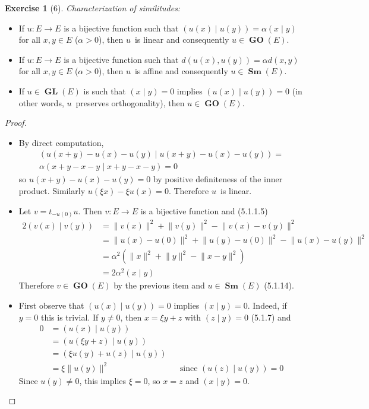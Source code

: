 \documentclass[letterpaper,12pt]{article}
\DeclareMathOperator{\GL}{\mathbf{GL}}
\DeclareMathOperator{\GO}{\mathbf{GO}}
\DeclareMathOperator{\Sm}{\mathbf{Sm}}
\newcommand{\norm}[1]{\lVert{#1}\rVert}
\newcommand{\innerprod}[2]{({#1}\;|\;{#2})}
\theoremstyle{definition}
\newtheorem*{exer}{Exercise}
\theoremstyle{remark}
\begin{document}
\begin{exer}[6]
\emph{Characterization of similitudes:}
\begin{itemize}[itemsep=0pt]
\item If \(u:E\to E\) is a bijective function such that \(\innerprod{u(x)}{u(y)}=\alpha\innerprod{x}{y}\) for all \(x,y\in E\) (\(\alpha>0\)), then \(u\)~is linear and consequently \(u\in\GO(E)\).
\item If \(u:E\to E\) is a bijective function such that \(d(u(x),u(y))=\alpha d(x,y)\) for all \(x,y\in E\) (\(\alpha>0\)), then \(u\)~is affine and consequently \(u\in\Sm(E)\).
\item If \(u\in\GL(E)\) is such that \(\innerprod{x}{y}=0\) implies \(\innerprod{u(x)}{u(y)}=0\) (in other words, \(u\)~preserves orthogonality), then \(u\in\GO(E)\).
\end{itemize}
\begin{proof}\
\begin{itemize}[itemsep=0pt]
\item By direct computation,
\begin{multline*}
\innerprod{u(x+y)-u(x)-u(y)}{u(x+y)-u(x)-u(y)}=\\\alpha\innerprod{x+y-x-y}{x+y-x-y}=0
\end{multline*}
so \(u(x+y)-u(x)-u(y)=0\) by positive definiteness of the inner product. Similarly \(u(\xi x)-\xi u(x)=0\). Therefore \(u\)~is linear.
\item Let \(v=t_{-u(0)}u\). Then \(v:E\to E\) is a bijective function and (5.1.1.5)
\begin{align*}
2\innerprod{v(x)}{v(y)}&=\norm{v(x)}^2+\norm{v(y)}^2-\norm{v(x)-v(y)}^2\\
	&=\norm{u(x)-u(0)}^2+\norm{u(y)-u(0)}^2-\norm{u(x)-u(y)}^2\\
	&=\alpha^2(\norm{x}^2+\norm{y}^2-\norm{x-y}^2)\\
	&=2\alpha^2\innerprod{x}{y}
\end{align*}
Therefore \(v\in\GO(E)\) by the previous item and \(u\in\Sm(E)\) (5.1.14).
\item First observe that \(\innerprod{u(x)}{u(y)}=0\) implies \(\innerprod{x}{y}=0\). Indeed, if \(y=0\) this is trivial. If \(y\ne 0\), then \(x=\xi y+z\) with \(\innerprod{z}{y}=0\) (5.1.7) and
\begin{align*}
0&=\innerprod{u(x)}{u(y)}\\
	&=\innerprod{u(\xi y+z)}{u(y)}&&\\
	&=\innerprod{\xi u(y)+u(z)}{u(y)}&&\\
	&=\xi\norm{u(y)}^2&&\text{since }\innerprod{u(z)}{u(y)}=0
\end{align*}
Since \(u(y)\ne 0\), this implies \(\xi=0\), so \(x=z\) and \(\innerprod{x}{y}=0\).


\end{itemize}
\end{proof}
\end{exer}
\end{document}
